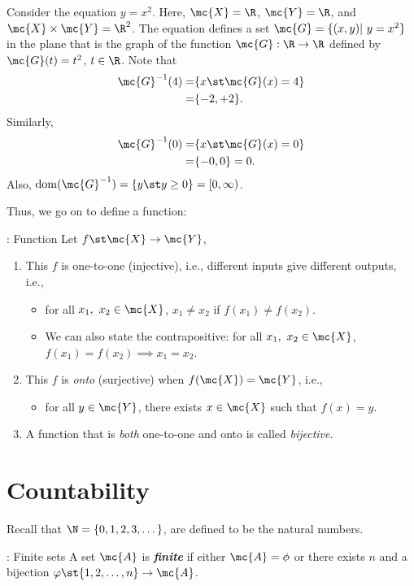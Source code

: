 \begin{example}
	Consider the equation \(y=x^2\). Here, \(\mc{X}=\R\), \(\mc{Y}=\R\), and \(\mc{X}\times \mc{Y}=\R^2\). The equation defines a set \(\mc{G}=\{(x,y)|~y=x^2\}\) in the plane that is the graph of the function \(\mc{G}:\R\to \R\) defined by \(\mc{G}(t)=t^2\), \(t\in \R\).
	\medskip
	Note that 
	\begin{align*}
		\mc{G}^{-1}(4)=&\{x\st \mc{G}(x)=4\}\\
		=&\{-2,+2\}.
	\end{align*}
	Similarly,
	\begin{align*}
		\mc{G}^{-1}(0)=&\{x\st \mc{G}(x)=0\}\\
		=&\{-0,0\}=0.
	\end{align*}
	Also, \(\operatorname{dom}(\mc{G}^{-1})=\{y\st y\geq 0\}=[0,\infty)\).
\end{example}
Thus, we go on to define a function:
\begin{ndef}{: Function}
	Let \(f\st \mc{X}\to \mc{Y}\),
	\begin{enumerate}
		\item This \(f\) is one-to-one (injective), i.e., different inputs give different outputs, i.e.,
		\begin{itemize}
			\item for all \(x_1,~x_2\in \mc{X}\), \(x_1\neq x_2\) if \(f(x_1)\neq f(x_2)\).
			
			\item We can also state the contrapositive: for all \(x_1,~x_2\in \mc{X}\), \(f(x_1)=f(x_2)\implies x_1=x_2\).
		\end{itemize}
		
		\item This \(f\) is \emph{onto} (surjective) when \(f(\mc{X})=\mc{Y}\), i.e., 
		\begin{itemize}
			\item for all \(y\in \mc{Y}\), there exists \(x\in \mc{X}\) such that \(f(x)=y\).
		\end{itemize}
		
		\item A function that is \emph{both} one-to-one and onto is called \emph{bijective}.
	\end{enumerate}
\end{ndef}

\clearpage

\section{Countability}
Recall that \(\N=\{0,1,2,3,\dots\}\), are defined to be the natural numbers. 
\begin{ndef}{: Finite sets}
	A set \(\mc{A}\) is \emph{\textbf{finite}} if either \(\mc{A}=\phi\) or there exists \(n\) and a bijection \(\varphi\st \{1,2,\dots, n\}\to \mc{A}\).
\end{ndef}

